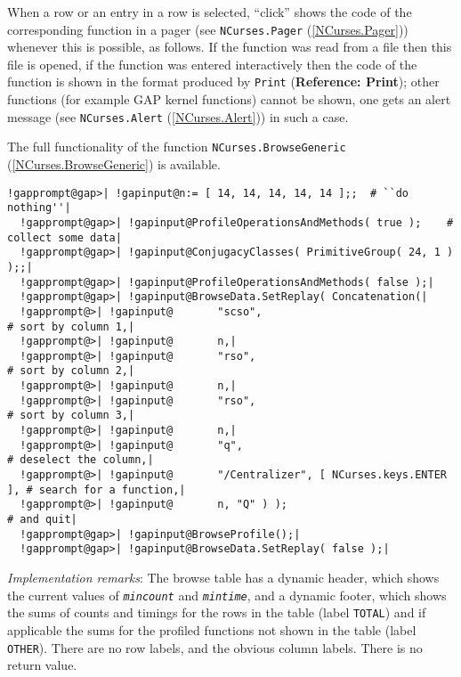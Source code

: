 \documentclass[a4paper,11pt]{report}
\begin{document}
{{{ When a row or an entry in a row is selected, ``click'' shows the code of the corresponding function in a pager (see \texttt{NCurses.Pager} (\ref{NCurses.Pager})) whenever this is possible, as follows. If the function was read from a file
then this file is opened, if the function was entered interactively then the
code of the function is shown in the format produced by \texttt{Print} (\textbf{Reference: Print}); other functions (for example \textsf{GAP} kernel functions) cannot be shown, one gets an alert message (see \texttt{NCurses.Alert} (\ref{NCurses.Alert})) in such a case. 

 The full functionality of the function \texttt{NCurses.BrowseGeneric} (\ref{NCurses.BrowseGeneric}) is available. 

 
\begin{Verbatim}[commandchars=!@|,fontsize=\small,frame=single,label=Example]
  !gapprompt@gap>| !gapinput@n:= [ 14, 14, 14, 14, 14 ];;  # ``do nothing''|
  !gapprompt@gap>| !gapinput@ProfileOperationsAndMethods( true );    # collect some data|
  !gapprompt@gap>| !gapinput@ConjugacyClasses( PrimitiveGroup( 24, 1 ) );;|
  !gapprompt@gap>| !gapinput@ProfileOperationsAndMethods( false );|
  !gapprompt@gap>| !gapinput@BrowseData.SetReplay( Concatenation(|
  !gapprompt@>| !gapinput@       "scso",                                 # sort by column 1,|
  !gapprompt@>| !gapinput@       n,|
  !gapprompt@>| !gapinput@       "rso",                                  # sort by column 2,|
  !gapprompt@>| !gapinput@       n,|
  !gapprompt@>| !gapinput@       "rso",                                  # sort by column 3,|
  !gapprompt@>| !gapinput@       n,|
  !gapprompt@>| !gapinput@       "q",                                    # deselect the column,|
  !gapprompt@>| !gapinput@       "/Centralizer", [ NCurses.keys.ENTER ], # search for a function,|
  !gapprompt@>| !gapinput@       n, "Q" ) );                             # and quit|
  !gapprompt@gap>| !gapinput@BrowseProfile();|
  !gapprompt@gap>| !gapinput@BrowseData.SetReplay( false );|
\end{Verbatim}
 

 \emph{Implementation remarks}: The browse table has a dynamic header, which shows the current values of \mbox{\texttt{\mdseries\slshape mincount}} and \mbox{\texttt{\mdseries\slshape mintime}}, and a dynamic footer, which shows the sums of counts and timings for the
rows in the table (label \texttt{TOTAL}) and if applicable the sums for the profiled functions not shown in the table
(label \texttt{OTHER}). There are no row labels, and the obvious column labels. There is no return
value. 

}}}
\end{document}
